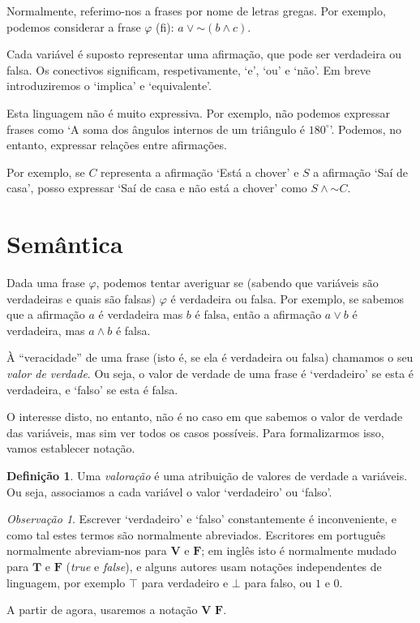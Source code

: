 \documentclass{article}
\theoremstyle{definition}
\newtheorem{definicao}{Definição}
\theoremstyle{remark}
\newtheorem{obs}{Observação}
\newcommand{\V}{\mathbf{V}}
\newcommand{\F}{\mathbf{F}}
\newcommand*{\lneg}{\mathord{\sim}}
\begin{document}
	Normalmente, referimo-nos a frases por nome de letras gregas. Por exemplo, podemos considerar a frase $\varphi$ (fi): $a \lor \lneg(b \land c)$.
	
	Cada variável é suposto representar uma afirmação, que pode ser verdadeira ou falsa. Os conectivos significam, respetivamente, `e', `ou' e `não'. Em breve introduziremos o `implica' e `equivalente'.
	
	Esta linguagem não é muito expressiva. Por exemplo, não podemos expressar frases como `A soma dos ângulos internos de um triângulo é $180^\circ$'. Podemos, no entanto, expressar relações entre afirmações.
	
	Por exemplo, se $C$ representa a afirmação `Está a chover' e $S$ a afirmação `Saí de casa', posso expressar `Saí de casa e não está a chover' como $S \land \lneg C$.
	
	\section{Semântica}
	
	Dada uma frase $\varphi$, podemos tentar averiguar se (sabendo que variáveis são verdadeiras e quais são falsas) $\varphi$ é verdadeira ou falsa. Por exemplo, se sabemos que a afirmação $a$ é verdadeira mas $b$ é falsa, então a afirmação $a \lor b$ é verdadeira, mas $a \land b$ é falsa.
	
	À ``veracidade'' de uma frase (isto é, se ela é verdadeira ou falsa) chamamos o seu \emph{valor de verdade}. Ou seja, o valor de verdade de uma frase é `verdadeiro' se esta é verdadeira, e `falso' se esta é falsa.
	
	O interesse disto, no entanto, não é no caso em que sabemos o valor de verdade das variáveis, mas sim ver todos os casos possíveis. Para formalizarmos isso, vamos establecer notação.
	
	\begin{definicao}
	Uma \emph{valoração} é uma atribuição de valores de verdade a variáveis. Ou seja, associamos a cada variável o valor `verdadeiro' ou `falso'.
	\end{definicao}
	
	\begin{obs}
	Escrever `verdadeiro' e `falso' constantemente é inconveniente, e como tal estes termos são normalmente abreviados. Escritores em português normalmente abreviam-nos para $\V$ e $\F$; em inglês isto é normalmente mudado para $\mathbf{T}$ e $\mathbf{F}$ (\textit{true} e \textit{false}), e alguns autores usam notações independentes de linguagem, por exemplo $\top$ para verdadeiro e $\bot$ para falso, ou $1$ e $0$.
	
	A partir de agora, usaremos a notação $\V$ $\F$.
	\end{obs}
	
\end{document}
